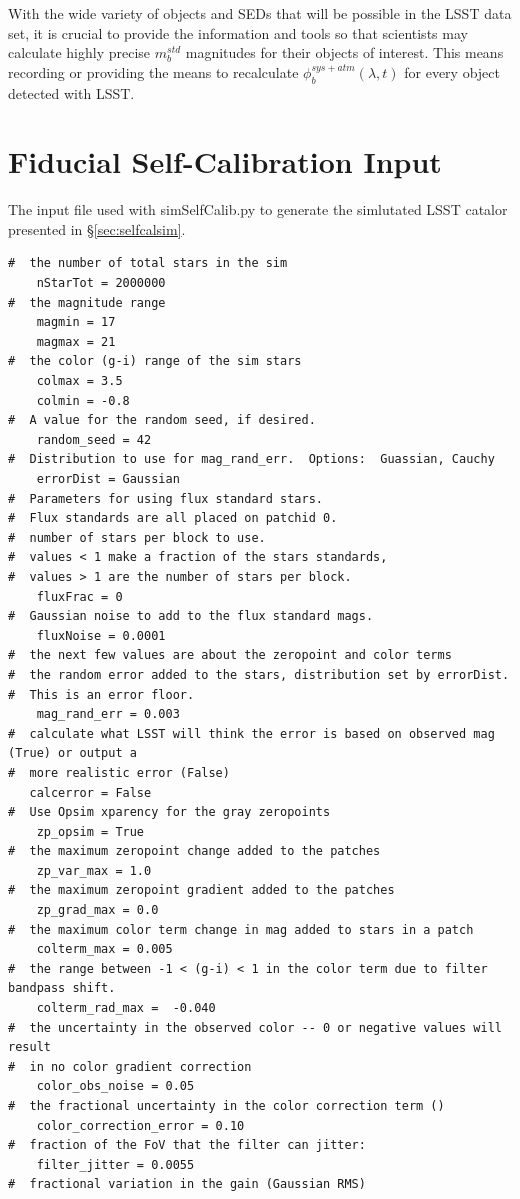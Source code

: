 \documentclass[12pt,preprint]{aastex}
\begin{document}
With the wide variety of objects and SEDs that will be possible in the
LSST data set, it is crucial to provide the information and tools so that
scientists may calculate highly precise $m_b^{std}$ magnitudes for
their objects of interest. This means recording or providing the means
to recalculate $\phi_b^{sys+atm}(\lambda,t)$ for every object detected
with LSST. 

\section{Fiducial Self-Calibration Input}\label{sec:siminput}
The input file used with simSelfCalib.py to generate the simlutated LSST catalor presented in \S\ref{sec:selfcalsim}.
\begin{verbatim}
#  the number of total stars in the sim
    nStarTot = 2000000
#  the magnitude range  
    magmin = 17
    magmax = 21
#  the color (g-i) range of the sim stars
    colmax = 3.5
    colmin = -0.8
#  A value for the random seed, if desired.
    random_seed = 42
#  Distribution to use for mag_rand_err.  Options:  Guassian, Cauchy
    errorDist = Gaussian
#  Parameters for using flux standard stars.  
#  Flux standards are all placed on patchid 0.
#  number of stars per block to use.  
#  values < 1 make a fraction of the stars standards, 
#  values > 1 are the number of stars per block.
    fluxFrac = 0
#  Gaussian noise to add to the flux standard mags.
    fluxNoise = 0.0001 
#  the next few values are about the zeropoint and color terms
#  the random error added to the stars, distribution set by errorDist.  
#  This is an error floor.
    mag_rand_err = 0.003
#  calculate what LSST will think the error is based on observed mag (True) or output a 
#  more realistic error (False)
   calcerror = False
#  Use Opsim xparency for the gray zeropoints
    zp_opsim = True
#  the maximum zeropoint change added to the patches
    zp_var_max = 1.0
#  the maximum zeropoint gradient added to the patches
    zp_grad_max = 0.0
#  the maximum color term change in mag added to stars in a patch
    colterm_max = 0.005
#  the range between -1 < (g-i) < 1 in the color term due to filter bandpass shift. 
    colterm_rad_max =  -0.040
#  the uncertainty in the observed color -- 0 or negative values will result
#  in no color gradient correction
    color_obs_noise = 0.05
#  the fractional uncertainty in the color correction term ()
    color_correction_error = 0.10
#  fraction of the FoV that the filter can jitter:   
    filter_jitter = 0.0055
#  fractional variation in the gain (Gaussian RMS)

\end{verbatim}
\end{document}
